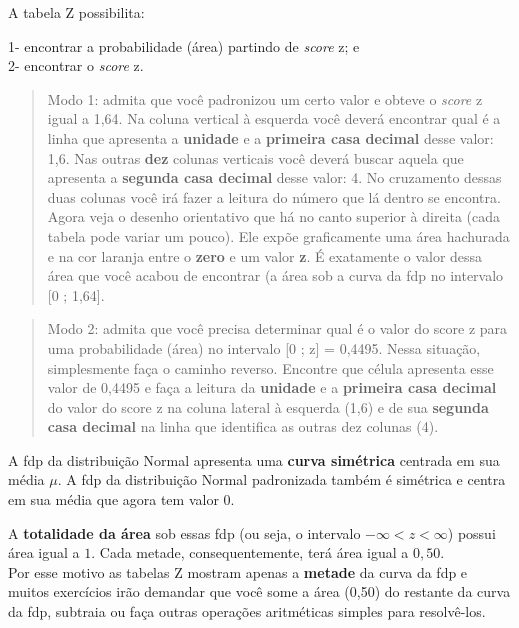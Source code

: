 \documentclass[
]{book}
\begin{document}
\hfill\break

A tabela Z possibilita:

\hfill\break

1- encontrar a probabilidade (área) partindo de \emph{score} z; e\\
2- encontrar o \emph{score} z.

\hfill\break

\begin{quote}
Modo 1: admita que você padronizou um certo valor e obteve o \emph{score} z igual a 1,64. Na coluna vertical à esquerda você deverá encontrar qual é a linha que apresenta a \textbf{unidade} e a \textbf{primeira casa decimal} desse valor: 1,6. Nas outras \textbf{dez} colunas verticais você deverá buscar aquela que apresenta a \textbf{segunda casa decimal} desse valor: 4. No cruzamento dessas duas colunas você irá fazer a leitura do número que lá dentro se encontra.
Agora veja o desenho orientativo que há no canto superior à direita (cada tabela pode variar um pouco). Ele expõe graficamente uma área hachurada e na cor laranja entre o \textbf{zero} e um valor \textbf{z}. É exatamente o valor dessa área que você acabou de encontrar (a área sob a curva da fdp no intervalo {[}0 ; 1,64{]}.
\end{quote}

\begin{quote}
Modo 2: admita que você precisa determinar qual é o valor do score z para uma probabilidade (área) no intervalo {[}0 ; z{]} = 0,4495. Nessa situação, simplesmente faça o caminho reverso.
Encontre que célula apresenta esse valor de 0,4495 e faça a leitura da \textbf{unidade} e a \textbf{primeira casa decimal} do valor do score z na coluna lateral à esquerda (1,6) e de sua \textbf{segunda casa decimal} na linha que identifica as outras dez colunas (4).
\end{quote}

\hfill\break

A fdp da distribuição Normal apresenta uma \textbf{curva simétrica} centrada em sua média \(\mu\). A fdp da distribuição Normal padronizada também é simétrica e centra em sua média que agora tem valor \(0\).

\hfill\break

A \textbf{totalidade da área} sob essas fdp (ou seja, o intervalo \(-\infty < z < \infty\)) possui área igual a \(1\). Cada metade, consequentemente, terá área igual a \(0,50\).\\

Por esse motivo as tabelas Z mostram apenas a \textbf{metade} da curva da fdp e muitos exercícios irão demandar que você some a área (0,50) do restante da curva da fdp, subtraia ou faça outras operações aritméticas simples para resolvê-los.
\end{document}
